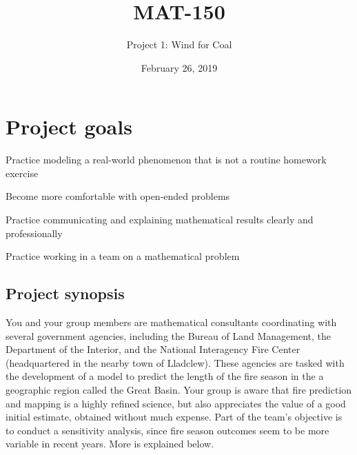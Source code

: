 \documentclass[11pt]{article}\usepackage[]{graphicx}\usepackage[]{color}
\title{MAT-150}
\author{Project 1: Wind for Coal}
\date{February 26, 2019}
\begin{document}

\thispagestyle{empty}
\maketitle
\thispagestyle{empty} \pagestyle{empty}








\section*{Project goals}
\begin{compactitem}
    \item Practice modeling a real-world phenomenon that is not a routine
        homework exercise
    \item Become more comfortable with open-ended problems
    \item Practice communicating and explaining mathematical results clearly    and professionally
    \item Practice working in a team on a mathematical problem
\end{compactitem}


\subsection*{Project synopsis}

    You and your group members are mathematical consultants coordinating with
    several government agencies, including the Bureau of Land Management, the
    Department of the Interior, and the National Interagency Fire Center
    (headquartered in the nearby town of Lladclew). These agencies are tasked with the
    development of a model to predict the length of the fire season in the
    a geographic region called the Great Basin. Your group is aware
    that fire prediction and mapping is a highly refined science, but also
    appreciates the value of a good initial estimate, obtained without much
    expense. Part of the team's objective is to conduct a sensitivity analysis,
    since fire season outcomes seem to be more variable in recent years. More
    is explained below.
\end{document}
